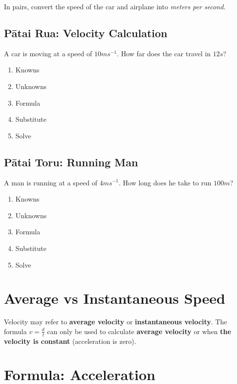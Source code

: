 \documentclass{report}
\begin{document}
In pairs, convert the speed of the car and airplane into \textit{meters per second}.

\vspace{3cm}

\subsection{Pātai Rua: Velocity Calculation}

A car is moving at a speed of $10ms^{-1}$. How far does the car travel in $12s$?

\begin{enumerate}
\item Knowns
\item Unknowns
\item Formula 
\item Substitute
\item Solve
\end{enumerate}

\vspace {3cm}

\subsection{Pātai Toru: Running Man}

A man is running at a speed of $4ms^{-1}$. How long does he take to run $100m$?

\begin{enumerate}
\item Knowns
\item Unknowns
\item Formula 
\item Substitute
\item Solve
\end{enumerate}

\vspace {3cm}

\section{Average vs Instantaneous Speed}

Velocity may refer to \textbf{average velocity} or \textbf{instantaneous velocity}. The formula $v = \frac{d}{t}$ can only be used to calculate \textbf{average velocity} or when \textbf{the velocity is constant} (acceleration is zero).

\section{Formula: Acceleration}
\end{document}
